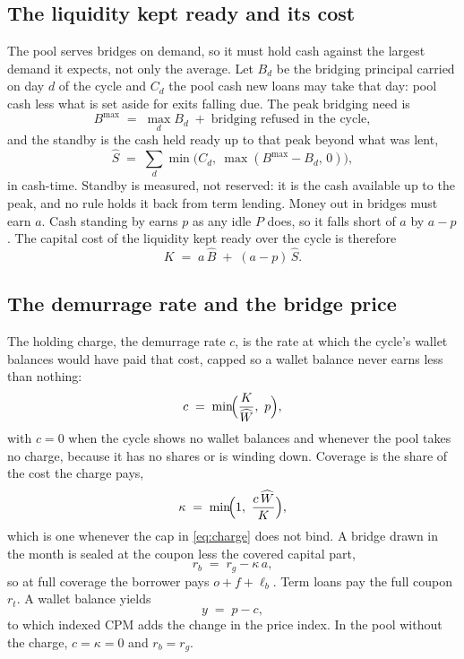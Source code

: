 \documentclass[10pt,a4paper]{article}
\theoremstyle{remark}
\newcommand{\cyc}[1]{\widehat{#1}}
\begin{document}
\subsection{The liquidity kept ready and its cost}
The pool serves bridges on demand, so it must hold cash against the largest
demand it expects, not only the average. Let \(B_d\) be the bridging
principal carried on day \(d\) of the cycle and \(C_d\) the pool cash new
loans may take that day: pool cash less what is set aside for exits
falling due. The peak bridging need is
\begin{equation}
B^{\max} \;=\; \max_{d} B_d \;+\; \text{bridging refused in the cycle},
\label{eq:peak}
\end{equation}
and the standby is the cash held ready up to that peak beyond what was lent,
\begin{equation}
\cyc S \;=\; \sum_{d}\min\!\bigl(C_d,\ \max(B^{\max}-B_d,\,0)\bigr),
\label{eq:standby}
\end{equation}
in cash-time. Standby is measured, not reserved: it is the cash
available up to the peak, and no rule holds it back from term lending. Money
out in bridges must earn \(a\). Cash standing by earns
\(p\) as any idle \(P\) does, so it falls short of \(a\) by \(a-p\). The
capital cost of the liquidity kept ready over the cycle is therefore
\begin{equation}
K \;=\; a\,\cyc B \;+\;(a-p)\,\cyc S .
\label{eq:cost}
\end{equation}

\subsection{The demurrage rate and the bridge price}
The holding charge, the demurrage rate \(c\), is the rate at which the cycle's
wallet balances would have paid
that cost, capped so a wallet balance never earns less than nothing:
\begin{equation}
c \;=\; \min\!\Bigl(\frac{K}{\cyc W},\ p\Bigr),
\label{eq:charge}
\end{equation}
with \(c=0\) when the cycle shows no wallet balances and whenever the pool
takes no charge, because it has no shares or is winding down. Coverage is the
share of the cost the charge pays,
\begin{equation}
\kappa \;=\; \min\!\Bigl(1,\ \frac{c\,\cyc W}{K}\Bigr),
\label{eq:coverage}
\end{equation}
which is one whenever the cap in \eqref{eq:charge} does not bind. A bridge
drawn in the month is sealed at the coupon less the covered capital part,
\begin{equation}
r_b \;=\; r_g-\kappa\,a ,
\label{eq:bridgeprice}
\end{equation}
so at full coverage the borrower pays \(o+f+\ell_b\). Term loans pay the full
coupon \(r_t\). A wallet balance yields
\begin{equation}
y \;=\; p-c ,
\label{eq:yield}
\end{equation}
to which indexed CPM adds the change in the price index. In the pool without
the charge, \(c=\kappa=0\) and \(r_b=r_g\).
\end{document}
